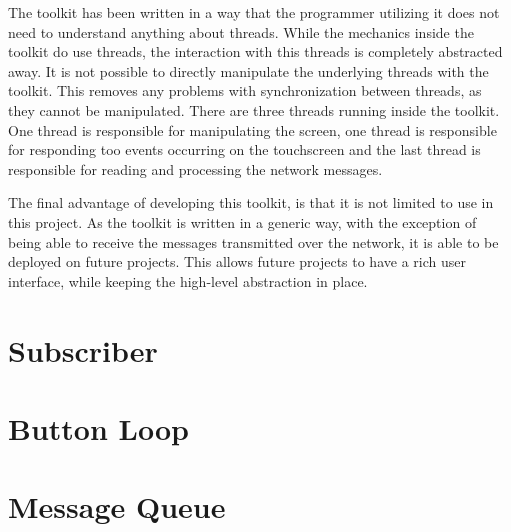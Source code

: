 The toolkit has been written in a way that the programmer utilizing it does not need to understand anything about threads. While the mechanics inside the toolkit do use threads, the interaction with this threads is completely abstracted away. It is not possible to directly manipulate the underlying threads with the toolkit. This removes any problems with synchronization between threads, as they cannot be manipulated. There are three threads running inside the toolkit. One thread is responsible for manipulating the screen, one thread is responsible for responding too events occurring on the touchscreen  and the last thread is responsible for reading and processing the network messages.

The final advantage of developing this toolkit, is that it is not limited to use in this project. As the toolkit is written in a generic way, with the exception of being able to receive the messages transmitted over the network, it is able to be deployed on future projects. This allows future projects to have a rich user interface, while keeping the high-level abstraction in place.





\section{Subscriber}

\section{Button Loop}

\section{Message Queue}

%
%
%
%
%
%







